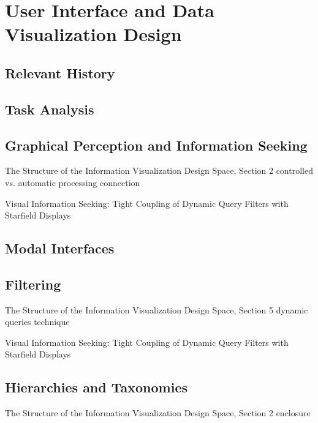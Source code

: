 \resetdatestamp

\chapter{User Interface and Data Visualization Design}

\section{Relevant History}

\section{Task Analysis}

\section{Graphical Perception and Information Seeking}

The Structure of the Information Visualization Design Space, Section 2 
controlled vs. automatic processing
connection

Visual Information Seeking: Tight Coupling of Dynamic Query Filters with Starfield Displays

\section{Modal Interfaces}

\section{Filtering}

The Structure of the Information Visualization Design Space, Section 5
dynamic queries technique 

Visual Information Seeking: Tight Coupling of Dynamic Query Filters with Starfield Displays

\section{Hierarchies and Taxonomies}

The Structure of the Information Visualization Design Space, Section 2
enclosure
